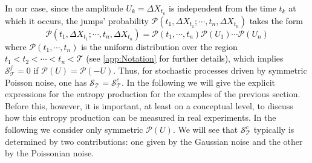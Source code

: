 \documentclass[12pt]{iopart}
\newcommand{\lx} {\left}
\newcommand{\rx} {\right}
\newcommand{\cP} {\mathcal{P}}
\newcommand{\cS} {\mathcal{S}}
\newcommand{\cT} {\mathcal{T}}
\begin{document}
\textcolor{black}{In our case, since the amplitude $U_k=\Delta X_{t_k}$ is independent from the time $t_k$ at which it occurs, the jumps' probability $\cP(t_1, \Delta X_{t_1}; \cdots,t_n,\Delta X_{t_n})$ takes the form
\begin{equation}
    \cP(t_1, \Delta X_{t_1}; \cdots,t_n,\Delta X_{t_n})=\cP(t_1,\cdots,t_n)\cP(U_{1})\cdots \cP(U_n)
\end{equation}
where $\cP(t_1,\cdots,t_n)$ is the uniform distribution over the region $t_1<t_2<\cdots<t_n<\cT$ (see \ref{app:Notation} for further details)}, which implies $\cS_\cT^{j}=0$ if $\cP(U)=\cP(-U)$. Thus, for stochastic processes driven by symmetric Poisson noise, one has $\cS_{\cT}=\cS^{c}_\cT$. In the following we will give the explicit expressions for the entropy production for the examples of the previous section. Before this, however, it is important, at least on a conceptual level, to discuss how this entropy production can be measured in real experiments. 
In the following we consider only symmetric $\cP(U)$. We will see that $\cS_\cT^c$ typically is determined by two contributions: one given by the Gaussian noise and the other by the Poissonian noise. 
\end{document}
